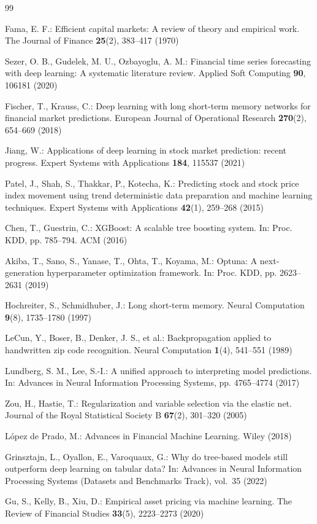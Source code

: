 \documentclass[runningheads]{llncs}
\begin{document}
{\footnotesize
\begin{thebibliography}{99}
\setlength{\itemsep}{0pt}
\setlength{\parskip}{0pt}
\setlength{\topsep}{0pt}
\setlength{\parsep}{0pt}
\raggedright

Fama, E. F.: Efficient capital markets: A review of theory and empirical work. The Journal of Finance \textbf{25}(2), 383--417 (1970)

Sezer, O. B., Gudelek, M. U., Ozbayoglu, A. M.: Financial time series forecasting with deep learning: A systematic literature review. Applied Soft Computing \textbf{90}, 106181 (2020)

Fischer, T., Krauss, C.: Deep learning with long short-term memory networks for financial market predictions. European Journal of Operational Research \textbf{270}(2), 654--669 (2018)

Jiang, W.: Applications of deep learning in stock market prediction: recent progress. Expert Systems with Applications \textbf{184}, 115537 (2021)

Patel, J., Shah, S., Thakkar, P., Kotecha, K.: Predicting stock and stock price index movement using trend deterministic data preparation and machine learning techniques. Expert Systems with Applications \textbf{42}(1), 259--268 (2015)

Chen, T., Guestrin, C.: XGBoost: A scalable tree boosting system. In: Proc. KDD, pp. 785--794. ACM (2016)

Akiba, T., Sano, S., Yanase, T., Ohta, T., Koyama, M.: Optuna: A next-generation hyperparameter optimization framework. In: Proc. KDD, pp. 2623--2631 (2019)

Hochreiter, S., Schmidhuber, J.: Long short-term memory. Neural Computation \textbf{9}(8), 1735--1780 (1997)

LeCun, Y., Boser, B., Denker, J. S., et al.: Backpropagation applied to handwritten zip code recognition. Neural Computation \textbf{1}(4), 541--551 (1989)

Lundberg, S. M., Lee, S.-I.: A unified approach to interpreting model predictions. In: Advances in Neural Information Processing Systems, pp. 4765--4774 (2017)

Zou, H., Hastie, T.: Regularization and variable selection via the elastic net. Journal of the Royal Statistical Society B \textbf{67}(2), 301--320 (2005)

L\'opez de Prado, M.: Advances in Financial Machine Learning. Wiley (2018)

Grinsztajn, L., Oyallon, E., Varoquaux, G.: Why do tree-based models still outperform deep learning on tabular data? In: Advances in Neural Information Processing Systems (Datasets and Benchmarks Track), vol.~35 (2022)

Gu, S., Kelly, B., Xiu, D.: Empirical asset pricing via machine learning. The Review of Financial Studies \textbf{33}(5), 2223--2273 (2020)

\end{thebibliography}
}
\end{document}
